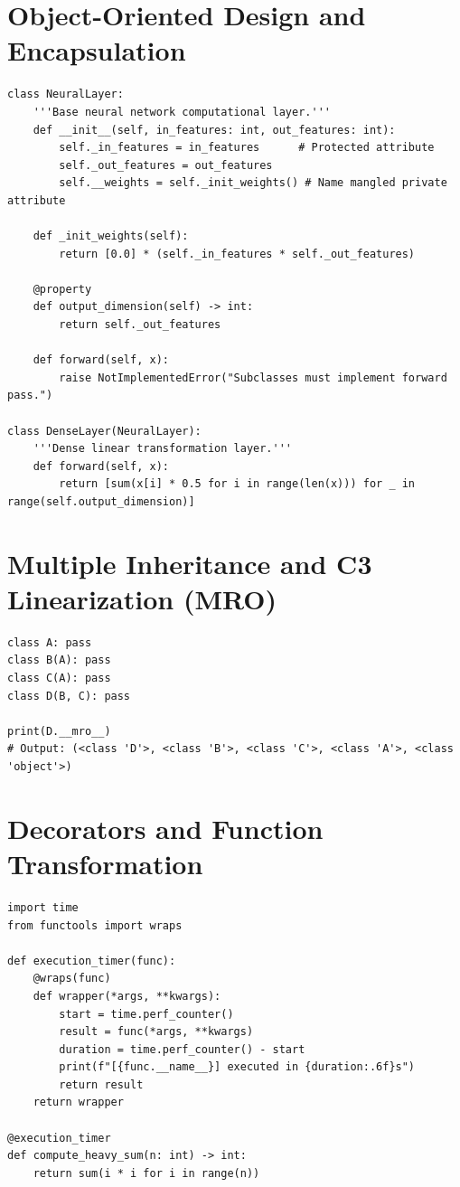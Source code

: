 \section{Object-Oriented Design and Encapsulation}
\begin{lstlisting}
class NeuralLayer:
    '''Base neural network computational layer.'''
    def __init__(self, in_features: int, out_features: int):
        self._in_features = in_features      # Protected attribute
        self._out_features = out_features
        self.__weights = self._init_weights() # Name mangled private attribute

    def _init_weights(self):
        return [0.0] * (self._in_features * self._out_features)

    @property
    def output_dimension(self) -> int:
        return self._out_features

    def forward(self, x):
        raise NotImplementedError("Subclasses must implement forward pass.")

class DenseLayer(NeuralLayer):
    '''Dense linear transformation layer.'''
    def forward(self, x):
        return [sum(x[i] * 0.5 for i in range(len(x))) for _ in range(self.output_dimension)]
\end{lstlisting}

\section{Multiple Inheritance and C3 Linearization (MRO)}
\begin{example}
\begin{lstlisting}
class A: pass
class B(A): pass
class C(A): pass
class D(B, C): pass

print(D.__mro__)
# Output: (<class 'D'>, <class 'B'>, <class 'C'>, <class 'A'>, <class 'object'>)
\end{lstlisting}
\end{example}

\section{Decorators and Function Transformation}
\begin{lstlisting}
import time
from functools import wraps

def execution_timer(func):
    @wraps(func)
    def wrapper(*args, **kwargs):
        start = time.perf_counter()
        result = func(*args, **kwargs)
        duration = time.perf_counter() - start
        print(f"[{func.__name__}] executed in {duration:.6f}s")
        return result
    return wrapper

@execution_timer
def compute_heavy_sum(n: int) -> int:
    return sum(i * i for i in range(n))
\end{lstlisting}

